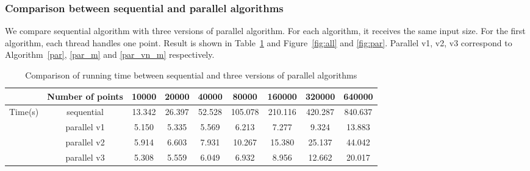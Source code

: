 \subsubsection{Comparison between sequential and parallel algorithms}
We compare sequential algorithm with three versions of parallel algorithm. For each algorithm, it
receives the same input size. For the first algorithm, each thread handles one point. Result is shown in
Table~\ref{tab:comparison} and Figure~\ref{fig:all} and \ref{fig:par}. Parallel v1, v2, v3 correspond to
Algorithm~\ref{par}, \ref{par_m} and \ref{par_vn_m} respectively.   
\begin{table}[!h]
  \centering
  \begin{tabular}{|c|c|c|c|c|c|c|c|c|}
    \hline
    {}& Number of points	& 10000	& 20000	& 40000	& 80000	& 160000	& 320000	& 640000 \\
    \hline
    \multirow{4}{*}{Time(s)}	& sequential	& 13.342	& 26.397	& 52.528	& 105.078	& 210.116	& 420.287	& 840.637 \\
    \cline{2-9}
	  & parallel v1	& 5.150	& 5.335	& 5.569	& 6.213	& 7.277	& 9.324	& 13.883 \\
    \cline{2-9}
	  & parallel v2	& 5.914	& 6.603	& 7.931	& 10.267	& 15.380	& 25.137	& 44.042 \\
    \cline{2-9}
	  & parallel v3	& 5.308	& 5.559	& 6.049	& 6.932	& 8.956	& 12.662	& 20.017 \\
    \hline
  \end{tabular}
  \label{tab:comparison}
  \caption{Comparison of running time between sequential and three versions of parallel algorithms}
\end{table}

